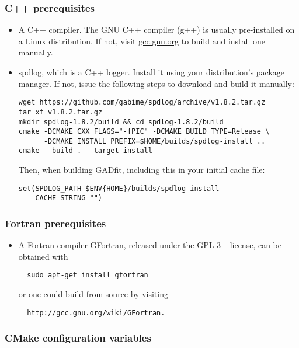\documentclass{article}
\begin{document}
\subsubsection{\label{sec:cxx_prerequisites}C++ prerequisites}

\begin{itemize}
\item A C++ compiler. The GNU C++ compiler (g++) is usually pre-installed on a Linux distribution. If not, visit \url{gcc.gnu.org} to build and install one manually.
\item spdlog, which is a C++ logger. Install it using your distribution's package manager. If not, issue the following steps to download and build it manually:
\begin{verbatim}
wget https://github.com/gabime/spdlog/archive/v1.8.2.tar.gz
tar xf v1.8.2.tar.gz
mkdir spdlog-1.8.2/build && cd spdlog-1.8.2/build
cmake -DCMAKE_CXX_FLAGS="-fPIC" -DCMAKE_BUILD_TYPE=Release \
      -DCMAKE_INSTALL_PREFIX=$HOME/builds/spdlog-install ..
cmake --build . --target install
\end{verbatim}
  Then, when building GADfit, including this in your initial cache file:
\begin{verbatim}
set(SPDLOG_PATH $ENV{HOME}/builds/spdlog-install
    CACHE STRING "")
\end{verbatim}
\end{itemize}

\subsubsection{\label{sec:fortran_prerequisites}Fortran prerequisites}

\begin{itemize}
\item A Fortran compiler
  GFortran, released under the GPL 3+ license, can be obtained with
\begin{verbatim}
  sudo apt-get install gfortran
\end{verbatim}
  or one could build from source by visiting
\begin{verbatim}
  http://gcc.gnu.org/wiki/GFortran.
\end{verbatim}
\end{itemize}

\subsubsection{\label{sec:cmake_configuration}CMake configuration variables}
\end{document}
